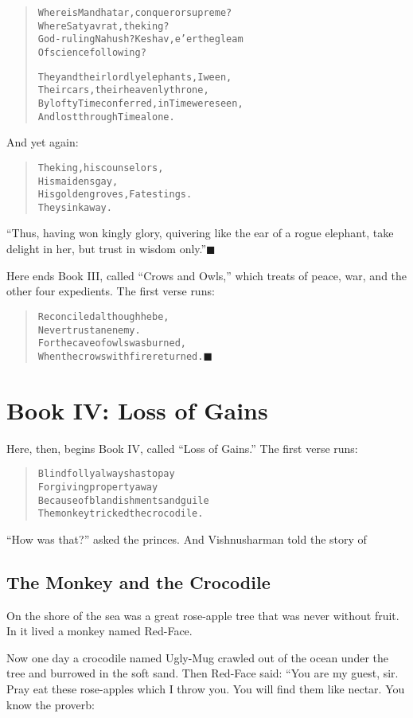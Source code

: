\documentclass[article, twoside, 14pt]{memoir}
\newcommand{\qed}{\hfill \ensuremath{\blacksquare}}
\renewenvironment{verbatim}{%
\begin{quote}%
\vskip -10pt%
\begin{alltt}\normalfont\large}{\end{alltt}%
\end{quote}%
\vskip -10pt
} %
\begin{document}
\begin{verbatim}
Where is Mandhatar, conqueror supreme?
    Where Satyavrat, the king?
God-ruling Nahush? Keshav, e'er the gleam
    Of science following?

They and their lordly elephants, I ween,
    Their cars, their heavenly throne,
By lofty Time conferred, in Time were seen,
    And lost through Time alone.
\end{verbatim}
And yet again:

\begin{verbatim}
The king, his counselors,
    His maidens gay,
His golden groves, Fate stings.
    They sink away.
\end{verbatim}
``Thus, having won kingly glory, quivering like the ear of a rogue elephant, take delight in her, but trust in wisdom only.''\hyperref[s47]{\qed}

Here ends Book III, called ``Crows and Owls,'' which treats of
peace, war, and the other four expedients. The first verse runs:

\begin{verbatim}
Reconciled although he be,
Never trust an enemy.
For the cave of owls was burned,
When the crows with fire returned.\hyperref[s46]{\qed}
\end{verbatim}
\part{Book IV: Loss of Gains}

\label{s65}

Here, then, begins Book IV, called ``Loss of Gains.'' The
first verse runs:

\begin{verbatim}
Blind folly always has to pay
For giving property away
Because of blandishments and guile{\textemdash}
The monkey tricked the crocodile.
\end{verbatim}
``How was that?'' asked the princes. And Vishnusharman told the
story of

\chapter{The Monkey and the Crocodile}

\label{s66}

On the shore of the sea was a great rose-apple tree that was never
without fruit. In it lived a monkey named Red-Face.

Now one day a crocodile named Ugly-Mug crawled out of the ocean
under the tree and burrowed in the soft sand. Then Red-Face said:
“You are my guest, sir. Pray eat these rose-apples which I throw
you. You will find them like nectar. You know the proverb:
\end{document}
